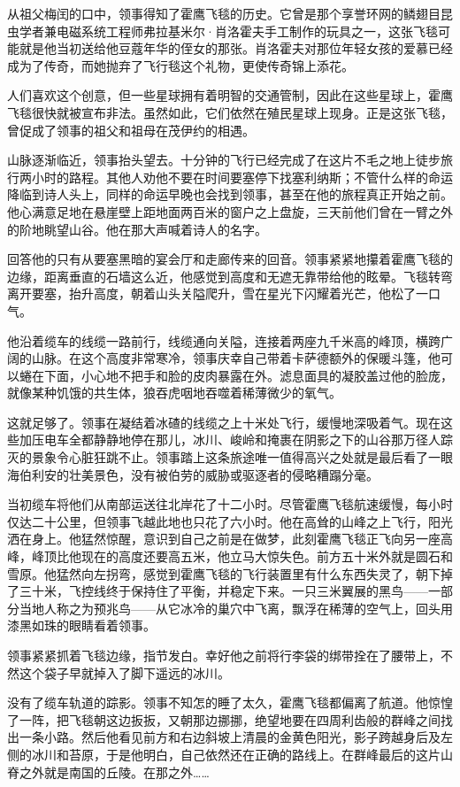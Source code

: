 \documentclass[AutoFakeBold=true]{book}
\begin{document}
从祖父梅闰的口中，领事得知了霍鹰飞毯的历史。它曾是那个享誉环网的鳞翅目昆虫学者兼电磁系统工程师弗拉基米尔·肖洛霍夫手工制作的玩具之一，这张飞毯可能就是他当初送给他豆蔻年华的侄女的那张。肖洛霍夫对那位年轻女孩的爱慕已经成为了传奇，而她抛弃了飞行毯这个礼物，更使传奇锦上添花。

人们喜欢这个创意，但一些星球拥有着明智的交通管制，因此在这些星球上，霍鹰飞毯很快就被宣布非法。虽然如此，它们依然在殖民星球上现身。正是这张飞毯，曾促成了领事的祖父和祖母在茂伊约的相遇。

山脉逐渐临近，领事抬头望去。十分钟的飞行已经完成了在这片不毛之地上徒步旅行两小时的路程。其他人劝他不要在时间要塞停下找塞利纳斯；不管什么样的命运降临到诗人头上，同样的命运早晚也会找到领事，甚至在他的旅程真正开始之前。他心满意足地在悬崖壁上距地面两百米的窗户之上盘旋，三天前他们曾在一臂之外的阶地眺望山谷。他在那大声喊着诗人的名字。

回答他的只有从要塞黑暗的宴会厅和走廊传来的回音。领事紧紧地攥着霍鹰飞毯的边缘，距离垂直的石墙这么近，他感觉到高度和无遮无靠带给他的眩晕。飞毯转弯离开要塞，抬升高度，朝着山头关隘爬升，雪在星光下闪耀着光芒，他松了一口气。

他沿着缆车的线缆一路前行，线缆通向关隘，连接着两座九千米高的峰顶，横跨广阔的山脉。在这个高度非常寒冷，领事庆幸自己带着卡萨德额外的保暖斗篷，他可以蜷在下面，小心地不把手和脸的皮肉暴露在外。滤息面具的凝胶盖过他的脸庞，就像某种饥饿的共生体，狼吞虎咽地吞噬着稀薄微少的氧气。

这就足够了。领事在凝结着冰碴的线缆之上十米处飞行，缓慢地深吸着气。现在这些加压电车全都静静地停在那儿，冰川、峻岭和掩裹在阴影之下的山谷那万径人踪灭的景象令心脏狂跳不止。领事踏上这条旅途唯一值得高兴之处就是最后看了一眼海伯利安的壮美景色，没有被伯劳的威胁或驱逐者的侵略糟蹋分毫。

当初缆车将他们从南部运送往北岸花了十二小时。尽管霍鹰飞毯航速缓慢，每小时仅达二十公里，但领事飞越此地也只花了六小时。他在高耸的山峰之上飞行，阳光洒在身上。他猛然惊醒，意识到自己之前是在做梦，此刻霍鹰飞毯正飞向另一座高峰，峰顶比他现在的高度还要高五米，他立马大惊失色。前方五十米外就是圆石和雪原。他猛然向左拐弯，感觉到霍鹰飞毯的飞行装置里有什么东西失灵了，朝下掉了三十米，飞控线终于保持住了平衡，并稳定下来。一只三米翼展的黑鸟——一部分当地人称之为预兆鸟——从它冰冷的巢穴中飞离，飘浮在稀薄的空气上，回头用漆黑如珠的眼睛看着领事。

领事紧紧抓着飞毯边缘，指节发白。幸好他之前将行李袋的绑带拴在了腰带上，不然这个袋子早就掉入了脚下遥远的冰川。

没有了缆车轨道的踪影。领事不知怎的睡了太久，霍鹰飞毯都偏离了航道。他惊惶了一阵，把飞毯朝这边扳扳，又朝那边挪挪，绝望地要在四周利齿般的群峰之间找出一条小路。然后他看见前方和右边斜坡上清晨的金黄色阳光，影子跨越身后及左侧的冰川和苔原，于是他明白，自己依然还在正确的路线上。在群峰最后的这片山脊之外就是南国的丘陵。在那之外……
\end{document}

